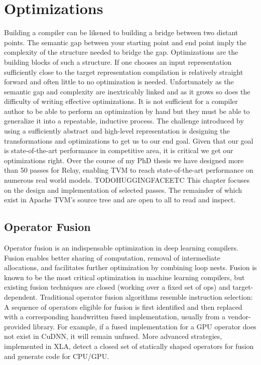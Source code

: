 \chapter{Optimizations}
\label{ch:optimizations}

Building a compiler can be likened to building a bridge between
    two distant points.
The semantic gap between your starting point and end point imply the
    complexity of the structure needed to bridge the gap.
Optimizations are the building blocks of such a structure.
If one chooses an input representation sufficiently close to
    the target representation compilation is relatively straight forward
    and often little to no optimization is needed.
Unfortunately as the semantic gap and complexity are inextricably linked
    and as it grows so does the difficulty of writing effective optimizations.
It is not sufficient for a compiler author to be able to perform an
    optimization by hand but they must be able to generalize it into
    a repeatable, inductive process.
The challenge introduced by using a sufficiently abstract and high-level
    representation is designing the transformations and optimizations
    to get us to our end goal.
Given that our goal is state-of-the-art performance in competitive
    area, it is critical we get our optimizations right.
Over the course of my PhD thesis we have designed more than 50 passes
    for Relay, enabling TVM to reach state-of-the-art performance
    on numerous real world models. TODOHUGGINGFACEETC
This chapter focuses on the design and implementation of selected passes.
The remainder of which exist in Apache TVM's source tree and are open to all to read and inspect.

\section{Operator Fusion}
\label{sec:fusion}

Operator fusion is an indispensable optimization in deep learning compilers.
Fusion enables better sharing of computation, removal of
  intermediate allocations, and facilitates further optimization by
  combining loop nests.
Fusion is known to be the most critical optimization in machine
  learning compilers, but existing fusion techniques
  are closed (working over a fixed set of ops)
  and target-dependent.
Traditional operator fusion algorithms resemble instruction
  selection:
A sequence of operators eligible
  for fusion is first identified and then replaced with a corresponding
  handwritten fused implementation, usually from a vendor-provided library.
For example, if a fused implementation for a GPU operator does not exist in CuDNN,
  it will remain unfused.
More advanced strategies, implemented in XLA, detect a
  closed set of statically shaped operators for fusion and
  generate code for CPU/GPU.

